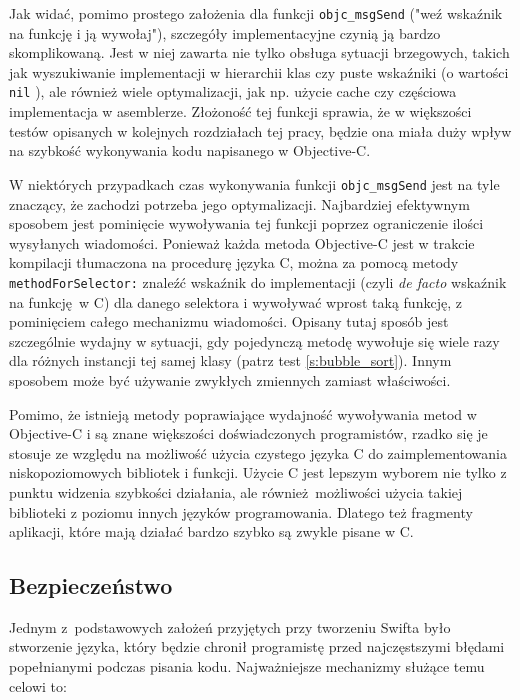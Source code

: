 \documentclass[mgr, shortabstract]{iithesis}
\newcommand{\objcinline}[1]{
    \texttt{#1}
}
\begin{document}
Jak widać, pomimo prostego założenia dla funkcji \objcinline{objc_msgSend} ("weź wskaźnik na funkcję i ją wywołaj"), szczegóły implementacyjne czynią ją bardzo skomplikowaną. Jest w niej zawarta nie tylko obsługa sytuacji brzegowych, takich jak wyszukiwanie implementacji w hierarchii klas czy puste wskaźniki (o wartości \objcinline{nil}), ale również wiele optymalizacji, jak np. użycie cache czy częściowa implementacja w asemblerze. Złożoność tej funkcji sprawia, że w większości testów opisanych w kolejnych rozdziałach tej pracy, będzie ona miała duży wpływ na szybkość wykonywania kodu napisanego w Objective-C.

W niektórych przypadkach czas wykonywania funkcji \objcinline{objc_msgSend} jest na tyle znaczący, że zachodzi potrzeba jego optymalizacji. Najbardziej efektywnym sposobem jest pominięcie wywoływania tej funkcji poprzez ograniczenie ilości wysyłanych wiadomości. Ponieważ każda metoda Objective-C jest w trakcie kompilacji tłumaczona na procedurę języka C, można za pomocą metody \objcinline{methodForSelector:} znaleźć wskaźnik do implementacji (czyli \textit{de facto} wskaźnik na funkcję w C) dla danego selektora i wywoływać wprost taką funkcję, z pominięciem całego mechanizmu wiadomości. Opisany tutaj sposób jest szczególnie wydajny w sytuacji, gdy pojedynczą metodę wywołuje się wiele razy dla różnych instancji tej samej klasy (patrz test \ref{s:bubble_sort}). Innym sposobem może być używanie zwykłych zmiennych zamiast właściwości.

Pomimo, że istnieją metody poprawiające wydajność wywoływania metod w Objective-C i są znane większości doświadczonych programistów, rzadko się je stosuje ze względu na możliwość użycia czystego języka C do zaimplementowania niskopoziomowych bibliotek i funkcji. Użycie C jest lepszym wyborem nie tylko z punktu widzenia szybkości działania, ale również możliwości użycia takiej biblioteki z poziomu innych języków programowania. Dlatego też fragmenty aplikacji, które mają działać bardzo szybko są zwykle pisane w C.

\subsection{Bezpieczeństwo}

Jednym z~podstawowych założeń przyjętych przy tworzeniu Swifta było stworzenie języka, który będzie chronił programistę przed najczęstszymi błędami popełnianymi podczas pisania kodu. Najważniejsze mechanizmy służące temu celowi to:
\end{document}
